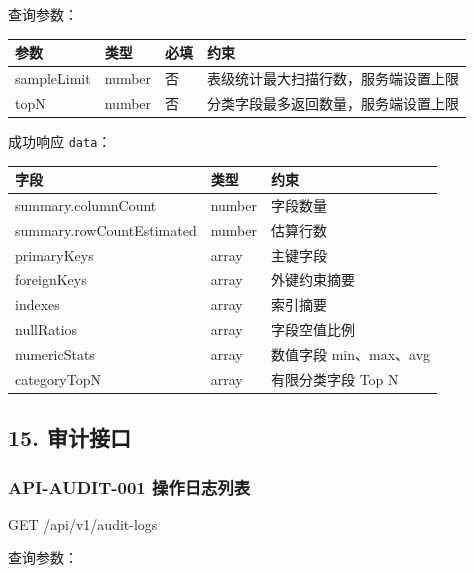 \documentclass[
  a4paper,
  UTF8]{ctexart}
\newenvironment{Shaded}{}{}
\newcommand{\NormalTok}[1]{#1}
\begin{document}
查询参数：

\begin{longtable}[]{@{}llll@{}}
\toprule
参数 & 类型 & 必填 & 约束 \\
\midrule
\endhead
sampleLimit & number & 否 & 表级统计最大扫描行数，服务端设置上限 \\
topN & number & 否 & 分类字段最多返回数量，服务端设置上限 \\
\bottomrule
\end{longtable}

成功响应 \texttt{data}：

\begin{longtable}[]{@{}lll@{}}
\toprule
字段 & 类型 & 约束 \\
\midrule
\endhead
summary.columnCount & number & 字段数量 \\
summary.rowCountEstimated & number & 估算行数 \\
primaryKeys & array & 主键字段 \\
foreignKeys & array & 外键约束摘要 \\
indexes & array & 索引摘要 \\
nullRatios & array & 字段空值比例 \\
numericStats & array & 数值字段 min、max、avg \\
categoryTopN & array & 有限分类字段 Top N \\
\bottomrule
\end{longtable}

\hypertarget{ux5ba1ux8ba1ux63a5ux53e3}{%
\subsection{15. 审计接口}\label{ux5ba1ux8ba1ux63a5ux53e3}}

\hypertarget{api-audit-001-ux64cdux4f5cux65e5ux5fd7ux5217ux8868}{%
\subsubsection{API-AUDIT-001
操作日志列表}\label{api-audit-001-ux64cdux4f5cux65e5ux5fd7ux5217ux8868}}

\begin{Shaded}
\begin{Highlighting}[]
\NormalTok{GET /api/v1/audit{-}logs}
\end{Highlighting}
\end{Shaded}

查询参数：
\end{document}
